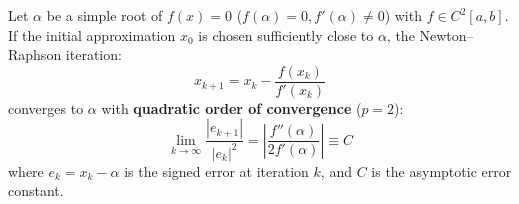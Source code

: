 \begin{theorembox}[Quadratic Convergence of the Newton--Raphson Method ($p = 2$)]
Let $\alpha$ be a simple root of $f(x) = 0$ ($f(\alpha) = 0, f'(\alpha) \ne 0$) with $f \in C^2[a, b]$. If the initial approximation $x_0$ is chosen sufficiently close to $\alpha$, the Newton--Raphson iteration:
\begin{equation}
    x_{k+1} = x_k - \frac{f(x_k)}{f'(x_k)}
\end{equation}
converges to $\alpha$ with \textbf{quadratic order of convergence} ($p = 2$):
\begin{equation}
    \boxed{\lim_{k \to \infty} \frac{|e_{k+1}|}{|e_k|^2} = \left| \frac{f''(\alpha)}{2 f'(\alpha)} \right| \equiv C}
\end{equation}
where $e_k = x_k - \alpha$ is the signed error at iteration $k$, and $C$ is the asymptotic error constant.
\end{theorembox}


